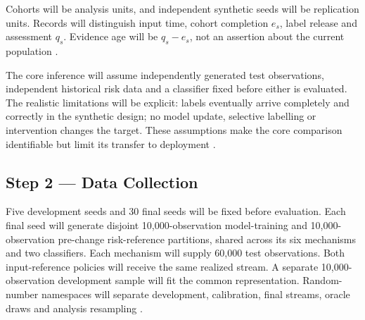 \documentclass[11pt,a4paper]{article}
\begin{document}
Cohorts will be analysis units, and independent synthetic seeds will be
replication units. Records will distinguish input time, cohort completion
$e_s$, label release and assessment $q_s$. Evidence age will be $q_s-e_s$,
not an assertion about the current population \cite{souza}.

The core inference will assume independently generated test observations,
independent historical risk data and a classifier fixed before either is
evaluated. The realistic limitations will be explicit: labels eventually
arrive completely and correctly in the synthetic design; no model update,
selective labelling or intervention changes the target. These assumptions
make the core comparison identifiable but limit its transfer to deployment
\cite{souza,alencar,nist}.

\subsection*{Step 2 --- Data Collection}
Five development seeds and 30 final seeds will be fixed before evaluation.
Each final seed will generate disjoint 10,000-observation model-training and
10,000-observation pre-change risk-reference partitions, shared across its six
mechanisms and two classifiers. Each mechanism will supply 60,000 test
observations. Both input-reference policies will receive the same realized
stream. A separate 10,000-observation development sample will fit the common
representation. Random-number namespaces will separate development,
calibration, final streams, oracle draws and analysis resampling
\cite{souza,cerqueira}.
\end{document}
